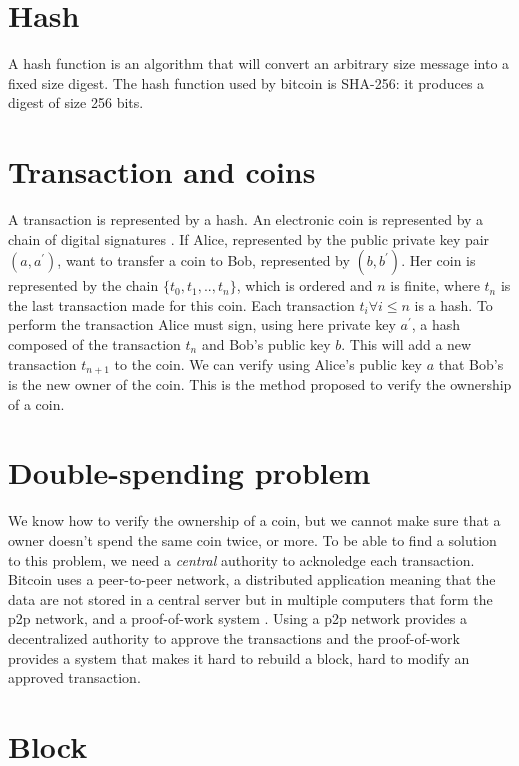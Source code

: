 \documentclass[letterpaper]{article}
\begin{document}
\section*{Hash}

A hash function is an algorithm that will convert an arbitrary
size message into a fixed size digest. The hash function
used by bitcoin is SHA-256: it produces a digest of size 256 bits.

\section*{Transaction and coins}

A transaction is represented by a hash.
An electronic coin is represented by a
chain of digital signatures \cite{bitcoin}.
If Alice, represented by the public private key pair $(a, a^{'})$,
want to transfer a coin to Bob, represented by $(b, b^{'})$. Her coin
is represented by the chain $\{t_0, t_1, .., t_n \}$, which is ordered
and $n$ is finite, where
$t_n$ is the last transaction made for this coin. Each transaction
$t_i \forall i \le n$ is a hash. To perform the transaction
Alice must sign, using
here private key $a^{'}$,
a hash composed of the transaction $t_n$ and Bob's public key $b$.
This will add a new
transaction $t_{n+1}$ to the coin. We can verify using Alice's public key $a$
that Bob's is the new owner of the coin.
This is the method proposed to verify the ownership of a coin.

\section*{Double-spending problem}

We know how to verify the ownership of a coin, but we cannot make sure
that a owner doesn't spend the same coin twice, or more.
To be able to find a solution to this problem, we need a \textit{central}
authority to acknoledge each transaction. Bitcoin uses a peer-to-peer network,
a distributed application meaning that the data are not stored in a
central server but in multiple computers that form the p2p network,
and a proof-of-work system \cite{hashcash}. Using a p2p network
provides a decentralized authority to approve the transactions and the proof-of-work
provides a system that makes it hard to rebuild a block, hard to modify
an approved transaction.


\section{Block}
\end{document}
